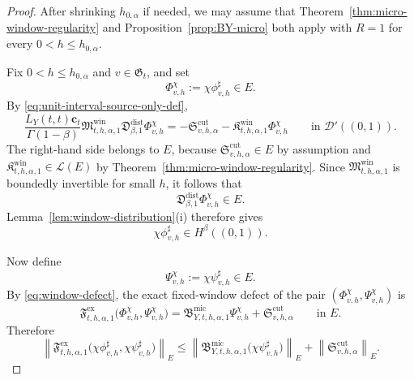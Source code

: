 \documentclass[11pt,a4paper]{amsart}
\theoremstyle{plain}
\theoremstyle{definition}
\theoremstyle{remark}
\begin{document}
\begin{proof}
After shrinking \(h_{0,\alpha}\) if needed, we may assume that
Theorem~\ref{thm:micro-window-regularity} and Proposition~\ref{prop:BY-micro} both apply with
\(R=1\) for every \(0<h\le h_{0,\alpha}\).

Fix \(0<h\le h_{0,\alpha}\) and \(v\in\mathfrak G_t\), and set
\[
\Phi_{v,h}^{\chi}:=\chi\phi_{v,h}^{\sharp}\in E.
\]
By \eqref{eq:unit-interval-source-only-def},
\[
\frac{L_Y(t,t)\mathbf c_t}{\Gamma(1-\beta)}
\mathfrak M_{t,h,\alpha,1}^{\mathrm{win}}
\mathfrak D_{\beta,1}^{\mathrm{dist}}
\Phi_{v,h}^{\chi}
=
-\mathfrak S_{v,h,\alpha}^{\mathrm{cut}}
-\mathfrak K_{t,h,\alpha,1}^{\mathrm{win}}\Phi_{v,h}^{\chi}
\qquad\text{in }\mathcal D'((0,1)).
\]
The right-hand side belongs to \(E\), because
\(\mathfrak S_{v,h,\alpha}^{\mathrm{cut}}\in E\) by assumption and
\(\mathfrak K_{t,h,\alpha,1}^{\mathrm{win}}\in\mathcal L(E)\) by
Theorem~\ref{thm:micro-window-regularity}. Since
\(\mathfrak M_{t,h,\alpha,1}^{\mathrm{win}}\) is boundedly invertible for small \(h\), it follows
that
\[
\mathfrak D_{\beta,1}^{\mathrm{dist}}\Phi_{v,h}^{\chi}\in E.
\]
Lemma~\ref{lem:window-distribution}(i) therefore gives
\[
\chi\phi_{v,h}^{\sharp}\in H^\beta((0,1)).
\]

Now define
\[
\Psi_{v,h}^{\chi}:=\chi\psi_{v,h}^{\sharp}\in E.
\]
By \eqref{eq:window-defect}, the exact fixed-window defect of the pair
\((\Phi_{v,h}^{\chi},\Psi_{v,h}^{\chi})\) is
\[
\mathfrak F_{t,h,\alpha,1}^{\mathrm{ex}}
\bigl(
\Phi_{v,h}^{\chi},
\Psi_{v,h}^{\chi}
\bigr)
=
\mathfrak B_{Y,t,h,\alpha,1}^{\mathrm{mic}}\Psi_{v,h}^{\chi}
+\mathfrak S_{v,h,\alpha}^{\mathrm{cut}}
\qquad\text{in }E.
\]
Therefore
\begin{equation}\label{eq:source-only-split}
\left\|
\mathfrak F_{t,h,\alpha,1}^{\mathrm{ex}}
\bigl(
\chi\phi_{v,h}^{\sharp},
\chi\psi_{v,h}^{\sharp}
\bigr)
\right\|_{E}
\le
\left\|
\mathfrak B_{Y,t,h,\alpha,1}^{\mathrm{mic}}
\bigl(
\chi\psi_{v,h}^{\sharp}
\bigr)
\right\|_{E}
+
\left\|
\mathfrak S_{v,h,\alpha}^{\mathrm{cut}}
\right\|_{E}.
\end{equation}


\end{proof}
\end{document}
